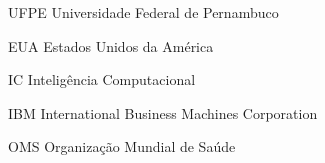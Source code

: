 \listoffigures*
\cleardoublepage

\renewcommand*{\lstlistlistingname}{Lista de Códigos}

\let\oldlstlistoflistings\lstlistoflistings
\renewcommand{\lstlistoflistings}{%
  \begingroup%
  \let\oldnumberline\numberline
  \renewcommand{\numberline}{\lstlistingname~\oldnumberline}%
  \oldlstlistoflistings%
  \endgroup}


\begin{KeepFromToc}
\lstlistoflistings
\end{KeepFromToc}
\cleardoublepage

\listoftables*
\cleardoublepage

\begin{siglas}
  \item[UFPE]   Universidade Federal de Pernambuco
  \item[EUA]    Estados Unidos da América
  \item[IC]     Inteligência Computacional
  \item[IBM]     International Business Machines Corporation
  \item[OMS]    Organização Mundial de Saúde
\end{siglas}

